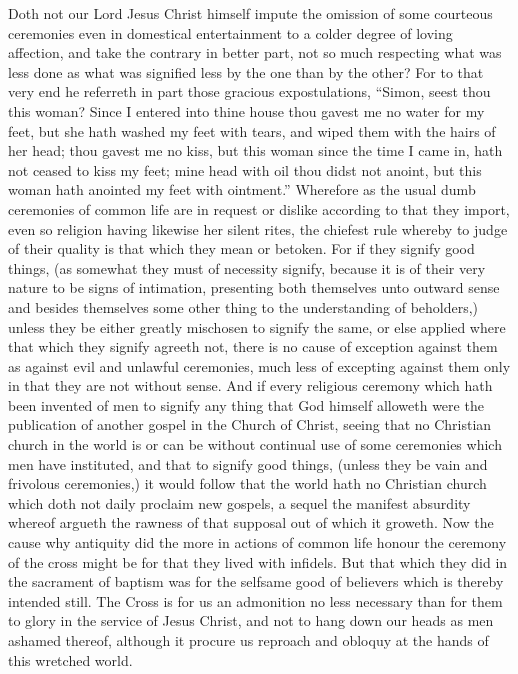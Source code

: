 Doth not our Lord Jesus Christ himself impute the omission  of some courteous ceremonies even in domestical entertainment to a colder degree of loving affection, and take the contrary in better part, not so much respecting what was less done as what was signified less by the one than by the other?
 For to that very end he referreth in part those gracious expostulations, “Simon, seest thou this woman? Since I entered into thine house thou gavest me no water for my feet, but she hath washed my feet with tears, and wiped them with the hairs of her head; thou gavest me no kiss, but this woman since the time I came in, hath not ceased to kiss my feet; mine head with oil thou didst not anoint, but this woman hath anointed my feet with ointment.”
Wherefore as the usual dumb ceremonies of common life are in request or dislike according to that they import, even so religion having likewise her silent rites, the chiefest rule whereby to judge of their quality is that which they mean or betoken. For if they signify good things, (as somewhat they must of necessity signify, because it is of their very nature to be signs of intimation, presenting both themselves unto outward sense and besides themselves some other thing to the understanding of beholders,) unless they be either greatly mischosen to signify the same, or else applied where that which they signify agreeth not, there is no cause of exception against them as against evil and unlawful ceremonies, much less of excepting against them only in that they are not without sense.
And if every religious ceremony which hath been invented of men to signify any thing that God himself alloweth were the publication of another gospel in the Church of Christ, seeing that no Christian church in the world is or can be without continual use of some ceremonies which men have instituted, and that to signify good things, (unless they be vain and frivolous ceremonies,) it would follow that the world hath no Christian church which doth not daily proclaim new gospels, a sequel the manifest absurdity whereof argueth the rawness of that supposal out of which it groweth.
Now the cause why antiquity did the more in actions  of common life honour the ceremony of the cross might be for that they lived with infidels. But that which they did in the sacrament of baptism was for the selfsame good of believers which is thereby intended still. The Cross is for us an admonition no less necessary than for them to glory in the service of Jesus Christ, and not to hang down our heads as men ashamed thereof, although it procure us reproach and obloquy at the hands of this wretched world.
